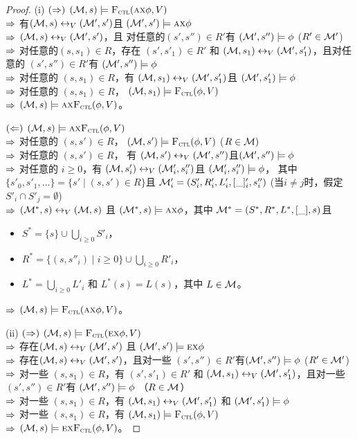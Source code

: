\begin{proof}
	(i) $(\Rightarrow)$ $({\cal M},s)\models{\textsc{F}_{\textsc{ctl}}}(\textsc{a}\textsc{x}\phi,V)$\\
	$\Rightarrow$ 有$({\cal M},s)\leftrightarrow_V({\cal M}',s')$且 $({\cal M}',s')\models \textsc{a}\textsc{x}\phi$\\
	$\Rightarrow$  $({\cal M},s)\leftrightarrow_V({\cal M}',s')$，且 对任意的$(s',s'')\in R'$有 $({\cal M}',s'')\models \phi$  ($R'\in{\cal M}'$)\\
	$\Rightarrow$ 对任意的$(s,s_1)\in R$，存在 $(s',s'_1)\in R'$ 和 $({\cal M},s_1)\leftrightarrow_V({\cal M}',s'_1)$，且对任意的 $(s',s'')\in R'$有
	$({\cal M}',s'')\models \phi$\\
	$\Rightarrow$ 对任意的 $(s,s_1)\in R$，有 $({\cal M},s_1)\leftrightarrow_V({\cal M}',s'_1)$且 $({\cal M}',s'_1)\models\phi$\\
	$\Rightarrow$ 对任意的 $(s,s_1)\in R$， $({\cal M},s_1)\models{\textsc{F}_{\textsc{ctl}}}(\phi,V)$\\
	$\Rightarrow$ $({\cal M},s)\models\textsc{a}\textsc{x}{\textsc{F}_{\textsc{ctl}}}(\phi,V)$。
	
	$(\Leftarrow)$ $({\cal M},s)\models\textsc{a}\textsc{x}{\textsc{F}_{\textsc{ctl}}}(\phi,V)$\\
	$\Rightarrow$ 对任意的 $(s,s')\in R$， $({\cal M},s')\models{\textsc{F}_{\textsc{ctl}}}(\phi,V)$ ($R\in {\cal M})$\\
	$\Rightarrow$ 对任意的 $(s,s')\in R$， 有 $({\cal M},s')\leftrightarrow_V({\cal M}',s'')$且$({\cal M}',s'')\models\phi$\\
	$\Rightarrow$ 对任意的 $i\ge 0$，有 $({\cal M},s'_i)\leftrightarrow_V({\cal M}'_i,s''_i)$且 $({\cal M}'_i,s''_i)\models\phi$，
	其中 $\{s'_0,s'_1,\ldots\}=\{s'\mid (s,s')\in R\}$且 ${\cal M}'_i=(S'_i,R'_i,L'_i,[\_]'_i,s''_i)$ (当$i\neq j$时，假定$S'_i\cap S'_j=\emptyset$)\\
	$\Rightarrow$ $({\cal M}^*,s)\leftrightarrow_V({\cal M},s)$ 且 $({\cal M}^*,s)\models\textsc{a}\textsc{x}\phi$，其中
	${\cal M}^*=(S^*,R^*,L^*,[\_], s)$且
	\begin{itemize}
		\item $S^*=\{s\}\cup\bigcup_{i\ge 0}S'_i$，
		\item $R^*=\{(s,s''_i)\mid i\ge 0\}\cup \bigcup_{i\ge 0} R'_i$，
		\item $L^*=\bigcup_{i\ge 0}L'_i$ 和 $L^*(s)=L(s)$，其中 $L\in{\cal M}$。
	\end{itemize}
	$\Rightarrow$ $({\cal M},s)\models {\textsc{F}_{\textsc{ctl}}}(\textsc{a}\textsc{x}\phi,V)$。
	
	(ii) $(\Rightarrow)$ $({\cal M},s)\models{\textsc{F}_{\textsc{ctl}}}(\textsc{e}\textsc{x}\phi,V)$\\
	$\Rightarrow$ 存在$({\cal M},s)\leftrightarrow_V({\cal M}',s')$ 且 $({\cal M}',s')\models \textsc{e}\textsc{x}\phi$\\
	$\Rightarrow$ 存在$({\cal M},s)\leftrightarrow_V({\cal M}',s')$，且对一些 $(s',s'')\in R'$有$({\cal M}',s'')\models \phi$  ($R'\in{\cal M}'$)\\
	$\Rightarrow$ 对一些 $(s,s_1)\in R$，有 $(s',s'_1)\in R'$ 和 $({\cal M},s_1)\leftrightarrow_V({\cal M}',s'_1)$，且对一些$(s',s'')\in R'$有
	$({\cal M}',s'')\models \phi$ （$R\in {\cal M}$）\\
	$\Rightarrow$ 对一些 $(s,s_1)\in R$，有 $({\cal M},s_1)\leftrightarrow_V({\cal M}',s'_1)$ 和 $({\cal M}',s'_1)\models\phi$\\
	$\Rightarrow$ 对一些 $(s,s_1)\in R$，有 $({\cal M},s_1)\models{\textsc{F}_{\textsc{ctl}}}(\phi,V)$\\
	$\Rightarrow$ $({\cal M},s)\models\textsc{e}\textsc{x}{\textsc{F}_{\textsc{ctl}}}(\phi,V)$。
	

\end{proof}
